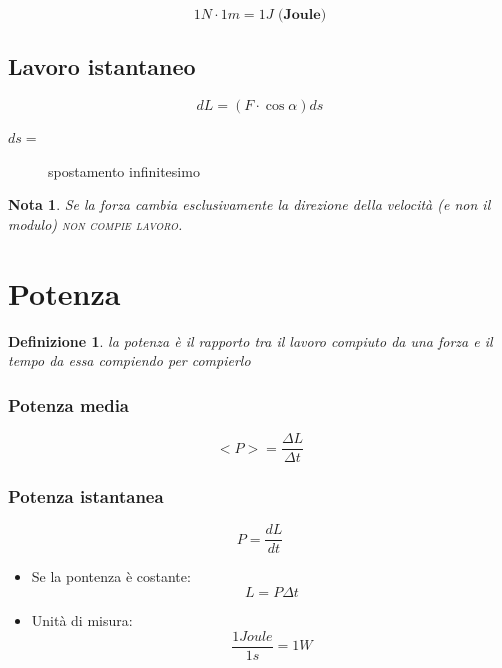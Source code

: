 \documentclass{book}
\newtheorem{defi}{Definizione}[section]
\newtheorem{nota}{Nota}[section]
\begin{document}
\begin{equation}
  \label{eq:joule}
  1N\cdot 1m=1J \textbf{ (Joule)}
\end{equation}

\subsection{Lavoro istantaneo}
\label{sec:lavoroistantaneo}

\begin{equation}
  \label{eq:lavista}
  dL=(F\cdot \cos \alpha)ds
\end{equation}
\begin{description}
\item[$ds=$] spostamento infinitesimo
\end{description}
\begin{nota}
  Se la forza cambia esclusivamente la direzione della velocità (\textit{e non il modulo}) \textsc{non compie lavoro}.
\end{nota}

\section{Potenza}
\label{sec:potenza}

\begin{defi}
  la potenza è il rapporto tra il lavoro compiuto da una forza e il tempo da essa compiendo per compierlo
\end{defi}
\begin{multicols}{2}
  \subsubsection{Potenza media}
  \label{sec:potmedia}
  \begin{equation}
    \label{eq:potmedia}
    <P>=\frac{\Delta L}{\Delta t}
  \end{equation}
  
  \subsubsection{Potenza istantanea}
  \label{sec:potistant}
  \begin{equation}
    \label{eq:potistant}
    P=\frac{dL}{dt}
  \end{equation}
\end{multicols}
\begin{itemize}
\item Se la pontenza è costante:
  \begin{equation}
    \label{eq:potconst}
    L=P\Delta t
  \end{equation}
\item Unità di misura:
  \begin{equation}
    \label{eq:unitadimisura}
    \frac{1 Joule}{1s}=1W
  \end{equation}
\end{itemize}
\end{document}
